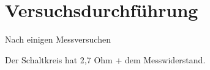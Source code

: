 \section{Versuchsdurchführung}
Nach einigen Messversuchen


Der Schaltkreis hat 2,7 Ohm + dem Messwiderstand.





